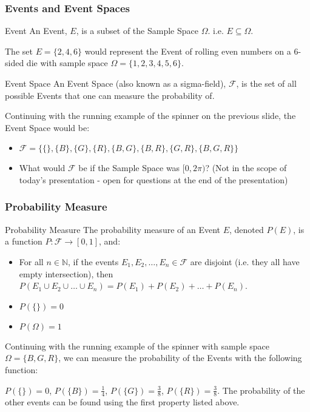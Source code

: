 \documentclass{beamer}
\begin{document}
\begin{frame}
  \frametitle{Events and Event Spaces}
  \begin{block}{Event \parencite[p.~192]{measure_tao}}
    An Event, $E$, is a subset of the Sample Space $\Omega$. i.e. $E \subseteq \Omega$.
  \end{block}
  \begin{example}
  The set $E = \{2,4,6\}$ would represent the Event of rolling even numbers on a 6-sided die with sample space $\Omega = \{1,2,3,4,5,6\}$.
  \end{example}
\end{frame}
\begin{frame}
  \begin{block}{Event Space \parencite[p.~192]{measure_tao}}
    An Event Space (also known as a sigma-field), $\mathscr{F}$, is the set of all possible Events that one can measure the probability of.
  \end{block}
  \begin{example}
    Continuing with the running example of the spinner on the previous slide, the Event Space would be:

    \begin{itemize}
      \item<2-> $\mathscr{F} = \{\{\}, \{B\}, \{G\}, \{R\}, \{B,G\}, \{B,R\}, \{G, R\}, \{B, G, R\}\}$
      \item<3-> What would $\mathscr{F}$ be if the Sample Space was $[0,2\pi)$? (Not in the scope of today's presentation - open for questions at the end of the presentation)
    \end{itemize}
  \end{example}
\end{frame}
\begin{frame}
  \frametitle{Probability Measure}
  \begin{block}{Probability Measure \parencite[p.~10]{daners}}
    The probability measure of an Event $E$, denoted $P(E)$, is a function $P: \mathscr{F} \rightarrow [0,1]$, and:
    \begin{itemize}
      \item For all $n \in \mathbb{N}$, if the events $E_1, E_2, \ldots, E_n \in \mathscr{F}$ are disjoint (i.e. they all have empty intersection), then $P(E_1 \cup E_2 \cup \ldots \cup E_n) = P(E_1) + P(E_2) + \ldots + P(E_n)$.
      \item $P(\{\}) = 0$
      \item $P(\Omega) = 1$
    \end{itemize}
  \end{block}
  \begin{example}
    \pause
    Continuing with the running example of the spinner with sample space $\Omega = \{B, G, R\}$, we can measure the probability of the Events with the following function:

    $P(\{\}) = 0$, $P(\{B\}) = \frac{1}{4}$, $P(\{G\}) = \frac{3}{8}$, $P(\{R\}) = \frac{3}{8}$. The probability of the other events can be found using the first property listed above.
  \end{example}
\end{frame}
\end{document}

